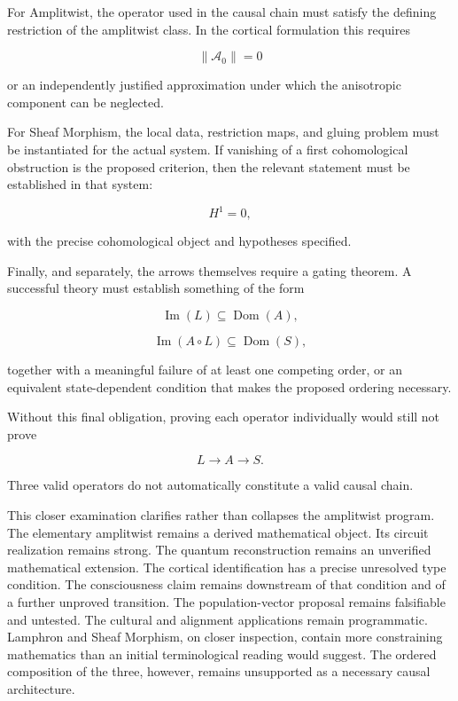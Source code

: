\documentclass[11pt]{article}
\begin{document}
For Amplitwist, the operator used in the causal chain must satisfy the defining restriction of the amplitwist class. In the cortical formulation this requires

\begin{equation}
\|\mathcal A_0\|=0
\end{equation}

or an independently justified approximation under which the anisotropic component can be neglected.

For Sheaf Morphism, the local data, restriction maps, and gluing problem must be instantiated for the actual system. If vanishing of a first cohomological obstruction is the proposed criterion, then the relevant statement must be established in that system:

\begin{equation}
H^1=0,
\end{equation}

with the precise cohomological object and hypotheses specified.

Finally, and separately, the arrows themselves require a gating theorem. A successful theory must establish something of the form

\begin{equation}
\operatorname{Im}(L)
\subseteq
\operatorname{Dom}(A),
\end{equation}

\begin{equation}
\operatorname{Im}(A\circ L)
\subseteq
\operatorname{Dom}(S),
\end{equation}

together with a meaningful failure of at least one competing order, or an equivalent state-dependent condition that makes the proposed ordering necessary.

Without this final obligation, proving each operator individually would still not prove

\begin{equation}
L\to A\to S.
\end{equation}

Three valid operators do not automatically constitute a valid causal chain.

This closer examination clarifies rather than collapses the amplitwist program. The elementary amplitwist remains a derived mathematical object. Its circuit realization remains strong. The quantum reconstruction remains an unverified mathematical extension. The cortical identification has a precise unresolved type condition. The consciousness claim remains downstream of that condition and of a further unproved transition. The population-vector proposal remains falsifiable and untested. The cultural and alignment applications remain programmatic. Lamphron and Sheaf Morphism, on closer inspection, contain more constraining mathematics than an initial terminological reading would suggest. The ordered composition of the three, however, remains unsupported as a necessary causal architecture.
\end{document}
